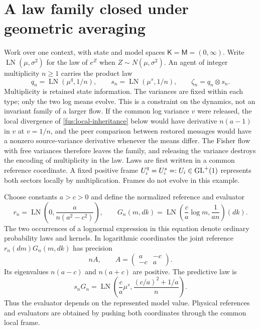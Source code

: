 \section{A law family closed under geometric averaging}

Work over one context, with state and model spaces
$\mathsf K=\mathsf M=(0,\infty)$. Write
$\operatorname{LN}(\mu,\sigma^2)$ for the law of $e^Z$ when
$Z\sim N(\mu,\sigma^2)$. An agent of integer multiplicity $n\geq1$ carries
the product law
\begin{equation}
 q_n=\operatorname{LN}(\mu^q,1/n),\qquad
 s_n=\operatorname{LN}(\mu^s,1/n),\qquad
 \zeta_n=q_n\otimes s_n.
 \label{fus:law-family}
\end{equation}
Multiplicity is retained state information. The variances are fixed within
each type; only the two log means evolve. This is a constraint on the
dynamics, not an invariant family of a larger flow. If the common log
variance $v$ were released, the local divergence of
\cref{fus:local-inheritance} below would have derivative $n(a-1)$ in $v$ at
$v=1/n$, and the peer comparison between restored messages would have a
nonzero source-variance derivative whenever the means differ. The Fisher
flow with free variances therefore leaves the family, and releasing the
variance destroys the encoding of multiplicity in the law. Laws are first
written in a common reference coordinate. A fixed positive frame
$U_i^q=U_i^s=:U_i\in\mathrm{GL}^+(1)$ represents both sectors locally by
multiplication. Frames do not evolve in this example.

Choose constants $a>c>0$ and define the normalized reference and evaluator
\begin{equation}
 r_n=\operatorname{LN}\left(0,\frac{a}{n(a^2-c^2)}\right),\qquad
 G_n(m,dk)=\operatorname{LN}\left(\frac ca\log m,\frac1{an}\right)(dk).
 \label{fus:evaluator}
\end{equation}
The two occurrences of a lognormal expression in this equation denote
ordinary probability laws and kernels. In logarithmic coordinates the joint
reference $r_n(dm)G_n(m,dk)$ has precision
\begin{equation}
 nA,\qquad A=\begin{pmatrix}a&-c\\-c&a\end{pmatrix}.
 \label{fus:precision}
\end{equation}
Its eigenvalues $n(a-c)$ and $n(a+c)$ are positive. The predictive law is
\begin{equation}
 s_nG_n=\operatorname{LN}\left(
 \frac ca\mu^s,\frac{(c/a)^2+1/a}{n}\right).
 \label{fus:predictive-law}
\end{equation}
Thus the evaluator depends on the represented model value. Physical
references and evaluators are obtained by pushing both coordinates through
the common local frame.

